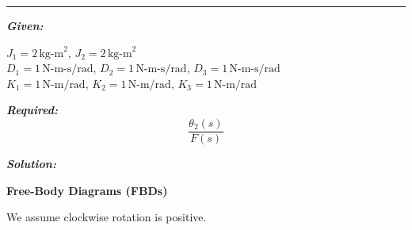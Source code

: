\documentclass[11pt]{article}
\begin{document}
\noindent\rule{\textwidth}{1pt}

\vspace{12pt}

\noindent\textbf{\textit{Given:}}

\begin{center}
    $J_1 = 2\, \text{kg-m}^2$, $J_2 = 2\, \text{kg-m}^2$ \\[6pt]
    $D_1 = 1\, \text{N-m-s/rad}$, $D_2 = 1\, \text{N-m-s/rad}$, $D_3 = 1\, \text{N-m-s/rad}$ \\[6pt]
    $K_1 = 1\, \text{N-m/rad}$, $K_2 = 1\, \text{N-m/rad}$, $K_3 = 1\, \text{N-m/rad}$
\end{center}


\noindent\textbf{\textit{Required:}}
\[
\frac{\theta_2(s)}{F(s)}
\]


\vspace{1.5em}
\noindent\textbf{\textit{Solution:}}

\vspace{8pt}

\noindent\textbf{Free-Body Diagrams (FBDs)}
\vspace{12pt}

We assume clockwise rotation is positive.
\end{document}

